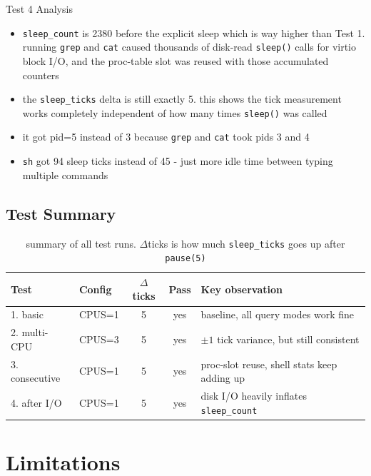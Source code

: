 \documentclass[12pt]{report}
\begin{document}
\begin{exbox}{Test 4 Analysis}
    \begin{itemize}[noitemsep]
        \item \texttt{sleep\_count} is 2380 before the explicit sleep which is way higher than Test 1. running \texttt{grep} and \texttt{cat} caused thousands of disk-read \texttt{sleep()} calls for virtio block I/O, and the proc-table slot was reused with those accumulated counters
        \item the \texttt{sleep\_ticks} delta is still exactly 5. this shows the tick measurement works completely independent of how many times \texttt{sleep()} was called
        \item it got pid=5 instead of 3 because \texttt{grep} and \texttt{cat} took pids 3 and 4
        \item \texttt{sh} got 94 sleep ticks instead of 45 - just more idle time between typing multiple commands
    \end{itemize}
\end{exbox}

\section{Test Summary}

\begin{table}[h]
\centering
\begin{tabularx}{\textwidth}{llccX}
\toprule
\textbf{Test} & \textbf{Config} & \textbf{$\Delta$ticks} & \textbf{Pass} & \textbf{Key observation} \\
\midrule
1. basic         & CPUS=1 & 5 & yes & baseline, all query modes work fine \\
2. multi-CPU     & CPUS=3 & 5 & yes & $\pm 1$ tick variance, but still consistent \\
3. consecutive   & CPUS=1 & 5 & yes & proc-slot reuse, shell stats keep adding up \\
4. after I/O     & CPUS=1 & 5 & yes & disk I/O heavily inflates \texttt{sleep\_count} \\
\bottomrule
\end{tabularx}
\caption{summary of all test runs. $\Delta$ticks is how much \texttt{sleep\_ticks} goes up after \texttt{pause(5)}}
\end{table}

\chapter{Limitations}
\end{document}
